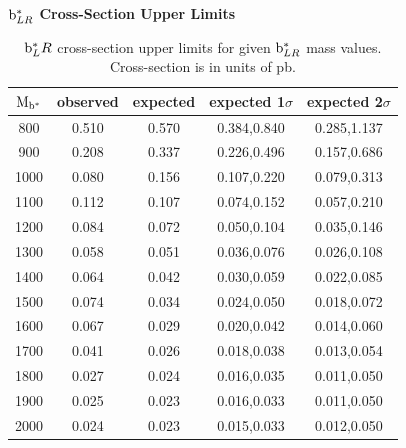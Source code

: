 \begin{table}[htcb]
\begin{center}
\bf{$\mathrm{b}^{*}_{LR}$ Cross-Section Upper Limits}\\
\begin{tabular}{|c||c|c|c|c|}
\hline
\bf{$\mathrm{M_{\mathrm{b}^{*}}}$} & \bf{observed}  & \bf{expected} & \bf{expected 1$\sigma$}  & \bf{expected 2$\sigma$} \\
\hline
\hline
800 & 0.510 & 0.570 & 0.384,0.840 & 0.285,1.137\\ 
\hline
900 & 0.208 & 0.337 & 0.226,0.496 & 0.157,0.686\\ 
\hline
1000 & 0.080 & 0.156 & 0.107,0.220 & 0.079,0.313\\ 
\hline
1100 & 0.112 & 0.107 & 0.074,0.152 & 0.057,0.210\\ 
\hline
1200 & 0.084 & 0.072 & 0.050,0.104 & 0.035,0.146\\ 
\hline
1300 & 0.058 & 0.051 & 0.036,0.076 & 0.026,0.108\\ 
\hline
1400 & 0.064 & 0.042 & 0.030,0.059 & 0.022,0.085\\ 
\hline
1500 & 0.074 & 0.034 & 0.024,0.050 & 0.018,0.072\\
\hline
1600 & 0.067 & 0.029 & 0.020,0.042 & 0.014,0.060\\ 
\hline
1700 & 0.041 & 0.026 & 0.018,0.038 & 0.013,0.054\\ 
\hline
1800 & 0.027 & 0.024 & 0.016,0.035 & 0.011,0.050\\ 
\hline
1900 & 0.025 & 0.023 & 0.016,0.033 & 0.011,0.050\\ 
\hline
2000 & 0.024 & 0.023 & 0.015,0.033 & 0.012,0.050\\ 
\hline
\end{tabular}
\end{center}
\caption{$\mathrm{b}^{*}_LR$ cross-section upper limits for given $\mathrm{b}^{*}_{LR}$ mass values.  Cross-section is in units of pb.}
\label{table:bsupperxsecLR}
\end{table}


